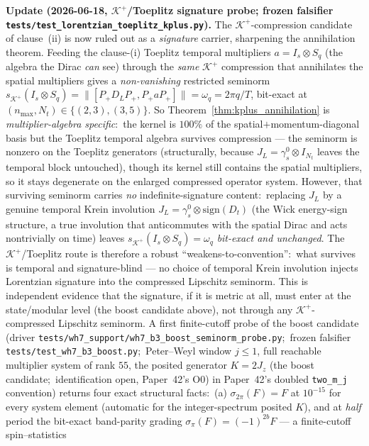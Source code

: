 \documentclass[11pt,a4paper]{article}
\theoremstyle{plain}
\theoremstyle{definition}
\newcommand{\nmax}{n_{\max}}
\newcommand{\Nt}{N_{t}}
\newcommand{\Krein}{\mathcal{K}}
\newcommand{\DL}{D_{L}}
\newcommand{\JL}{J_{L}}
\newcommand{\Kplus}{\Krein^{+}}
\newcommand{\Pplus}{P_{+}}
\begin{document}
\begin{enumerate}
\textbf{Update (2026-06-18, $\Kplus$/Toeplitz signature probe; frozen
falsifier \texttt{tests/test\_lorentzian\_toeplitz\_kplus.py}).} The
$\Kplus$-compression candidate of clause~(ii) is now ruled out as a
\emph{signature} carrier, sharpening the annihilation theorem. Feeding
the clause-(i) Toeplitz temporal multipliers $a = I_{s} \otimes S_{q}$
(the algebra the Dirac \emph{can} see) through the \emph{same} $\Kplus$
compression that annihilates the spatial multipliers gives a
\emph{non-vanishing} restricted seminorm
$s_{\Kplus}(I_{s} \otimes S_{q}) = \|[\Pplus\DL\Pplus,
\Pplus a \Pplus]\| = \omega_{q} = 2\pi q/T$, bit-exact at
$(\nmax,\Nt) \in \{(2,3),(3,5)\}$. So Theorem~\ref{thm:kplus_annihilation}
is \emph{multiplier-algebra specific}:\ the kernel is $100\%$ of the
spatial$+$momentum-diagonal basis but the Toeplitz temporal algebra
survives compression --- the seminorm is nonzero on the Toeplitz
generators (structurally, because
$\JL = \gamma^{0}_{s} \otimes I_{\Nt}$ leaves the temporal block
untouched), though its kernel still contains the spatial multipliers,
so it stays degenerate on the enlarged compressed operator system. However, that surviving seminorm carries \emph{no}
indefinite-signature content:\ replacing $\JL$ by a genuine temporal
Krein involution $\JL = \gamma^{0}_{s} \otimes \mathrm{sign}(D_{t})$
(the Wick energy-sign structure, a true involution that anticommutes
with the spatial Dirac and acts nontrivially on time) leaves
$s_{\Kplus}(I_{s} \otimes S_{q}) = \omega_{q}$ \emph{bit-exact and
unchanged}. The $\Kplus$/Toeplitz route is therefore a robust
``weakens-to-convention'':\ what survives is temporal and
signature-blind --- no choice of temporal Krein involution injects Lorentzian
signature into the compressed Lipschitz seminorm. This is independent
evidence that the signature, if it is metric at all, must enter at the
state/modular level (the boost candidate above), not through any
$\Kplus$-compressed Lipschitz seminorm. A first finite-cutoff probe of
the boost candidate (driver
\texttt{tests/wh7\_support/wh7\_b3\_boost\_seminorm\_probe.py};\ frozen falsifier
\texttt{tests/test\_wh7\_b3\_boost.py};\ Peter--Weyl window $j \le 1$,
full reachable multiplier system of rank $55$, the posited generator $K = 2J_{z}$ (the boost candidate;\ identification open, Paper~42's O0) in
Paper~42's doubled \texttt{two\_m\_j} convention) returns four exact
structural facts:\
(a) $\sigma_{2\pi}(F) = F$ at $10^{-15}$ for every system element
(automatic for the integer-spectrum posited $K$), and
at \emph{half} period the bit-exact band-parity grading
$\sigma_{\pi}(F) = (-1)^{2b} F$ — a finite-cutoff spin--statistics

\end{enumerate}
\end{document}
